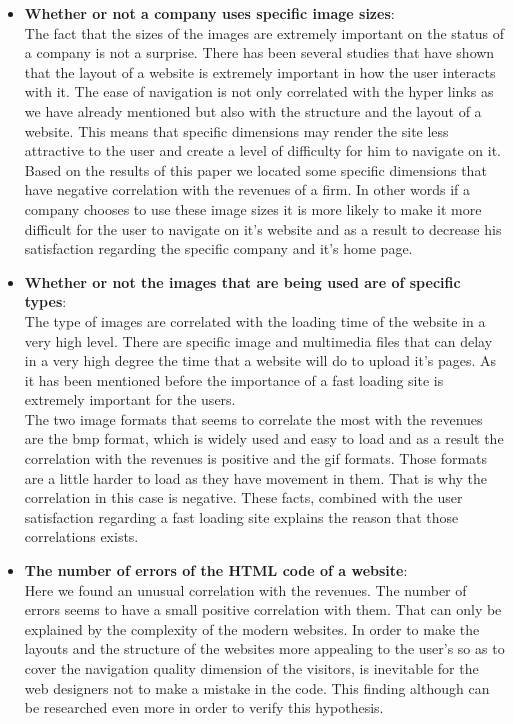 \documentclass{book}
\begin{document}
\begin{itemize}
\item \textbf{Whether or not a company uses specific image sizes}:\\
The fact that the sizes of the images are extremely important on the status of a company is not a surprise. There has been several studies that have shown that the layout of a website is extremely important in how the user interacts with it. The ease of navigation is not only correlated with the hyper links as we have already mentioned but also with the structure and the layout of a website. This means that specific dimensions may render the site less attractive to the user and create a level of difficulty for him to navigate on it.\cite{key11,key20,key23,key24,key25}\\
Based on the results of this paper we located some specific dimensions that have negative correlation with the revenues of a firm. In other words if a company chooses to use these image sizes it is more likely to make it more difficult for the user to navigate on it's website and as a result to decrease his satisfaction regarding the specific company and it's home page.   
\item \textbf{Whether or not the images that are being used are of specific types}:\\
The type of images are correlated with the loading time of the website in a very high level. There are specific image and multimedia files that can delay in a very high degree the time that a website will do to upload it's pages. As it has been mentioned before the importance of a fast loading site is extremely important for the users.\cite{key19,key3,key22}\\
The two image formats that seems to correlate the most with the revenues are the bmp format, which is widely used and easy to load and as a result the correlation with the revenues is positive and the gif formats. Those formats are a little harder to load as they have movement in them. That is why the correlation in this case is negative. These facts, combined with the user satisfaction regarding a fast loading site explains the reason that those correlations exists.
\item \textbf{The number of errors of the HTML code of a website}:\\
Here we found an unusual correlation with the revenues. The number of errors seems to have a small positive correlation with them. That can only be explained by the complexity of the modern websites. In order to make the layouts and the structure of the websites more appealing to the user's so as to cover the navigation quality dimension\cite{key11,key20,key23,key24,key25} of the visitors, is inevitable for the web designers not to make a mistake in the code. This finding although can be researched even more in order to verify this hypothesis.
\end{itemize}
\end{document}
